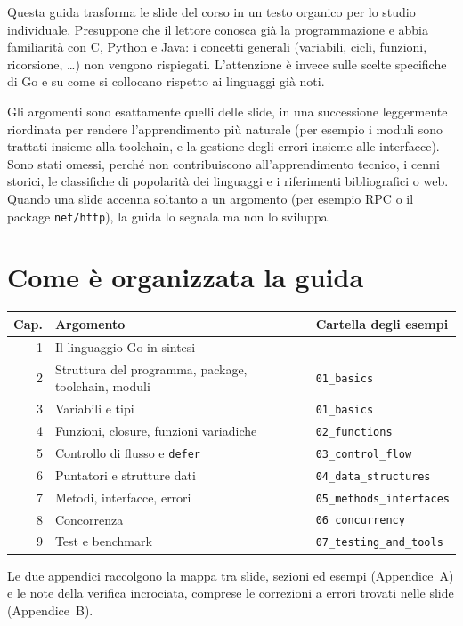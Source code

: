 \documentclass[11pt,a4paper]{report}
\newcommand{\cod}[1]{\texttt{#1}}
\begin{document}
Questa guida trasforma le slide del corso in un testo organico per lo studio
individuale. Presuppone che il lettore conosca già la programmazione e abbia
familiarità con C, Python e Java: i concetti generali (variabili, cicli,
funzioni, ricorsione, \ldots) non vengono rispiegati. L'attenzione è invece sulle
scelte specifiche di Go e su come si collocano rispetto ai linguaggi già noti.

Gli argomenti sono esattamente quelli delle slide, in una successione
leggermente riordinata per rendere l'apprendimento più naturale
(per esempio i moduli sono trattati insieme alla toolchain, e la gestione degli
errori insieme alle interfacce). Sono stati omessi, perché non contribuiscono
all'apprendimento tecnico, i cenni storici, le classifiche di popolarità dei
linguaggi e i riferimenti bibliografici o web. Quando una slide accenna soltanto
a un argomento (per esempio RPC o il package \cod{net/http}), la guida lo
segnala ma non lo sviluppa.

\section*{Come è organizzata la guida}

\begin{center}
\small
\begin{tabular}{@{}rll@{}}
\toprule
\textbf{Cap.} & \textbf{Argomento} & \textbf{Cartella degli esempi}\\
\midrule
1 & Il linguaggio Go in sintesi & ---\\
2 & Struttura del programma, package, toolchain, moduli & \texttt{01\_basics}\\
3 & Variabili e tipi & \texttt{01\_basics}\\
4 & Funzioni, closure, funzioni variadiche & \texttt{02\_functions}\\
5 & Controllo di flusso e \cod{defer} & \texttt{03\_control\_flow}\\
6 & Puntatori e strutture dati & \texttt{04\_data\_structures}\\
7 & Metodi, interfacce, errori & \texttt{05\_methods\_interfaces}\\
8 & Concorrenza & \texttt{06\_concurrency}\\
9 & Test e benchmark & \texttt{07\_testing\_and\_tools}\\
\bottomrule
\end{tabular}
\end{center}

Le due appendici raccolgono la mappa tra slide, sezioni ed esempi (Appendice~A) e
le note della verifica incrociata, comprese le correzioni a errori trovati nelle
slide (Appendice~B).
\end{document}
